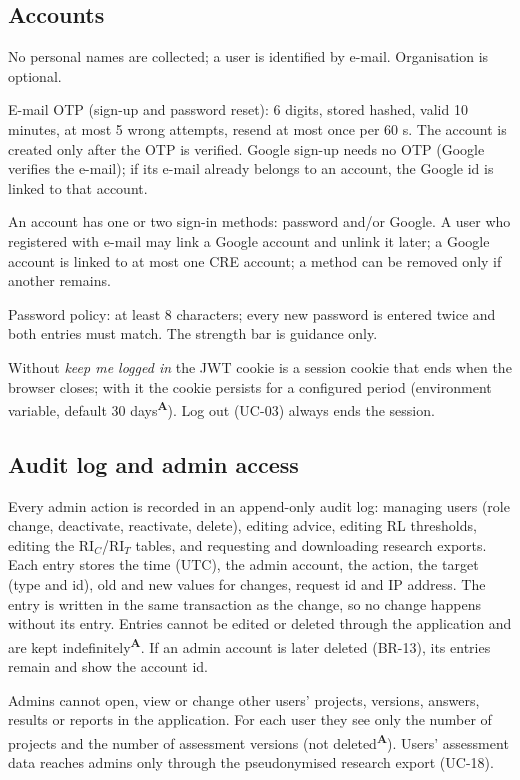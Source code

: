 \documentclass[11pt,a4paper]{article}
\newcommand{\RIC}{\mathrm{RI}_{C}}
\newcommand{\RIT}{\mathrm{RI}_{T}}
\newcommand{\assume}{\textsuperscript{\textcolor{orange!80!black}{\textbf{A}}}}
\begin{document}
\subsection*{Accounts}
\begin{description}[style=nextline,leftmargin=1.6cm,labelwidth=1.4cm,font=\bfseries\color{creBlue}]
\item[BR-15] No personal names are collected; a user is identified by e-mail. Organisation is optional.
\item[BR-16] E-mail OTP (sign-up and password reset): 6 digits, stored hashed, valid 10 minutes, at most 5 wrong attempts, resend at most once per 60 s. The account is created only after the OTP is verified. Google sign-up needs no OTP (Google verifies the e-mail); if its e-mail already belongs to an account, the Google id is linked to that account.
\item[BR-17] An account has one or two sign-in methods: password and/or Google. A user who registered with e-mail may link a Google account and unlink it later; a Google account is linked to at most one CRE account; a method can be removed only if another remains.
\item[BR-22] Password policy: at least 8 characters; every new password is entered twice and both entries must match. The strength bar is guidance only.
\item[BR-23] Without \emph{keep me logged in} the JWT cookie is a session cookie that ends when the browser closes; with it the cookie persists for a configured period (environment variable, default 30 days\assume). Log out (UC-03) always ends the session.
\end{description}

\subsection*{Audit log and admin access}
\begin{description}[style=nextline,leftmargin=1.6cm,labelwidth=1.4cm,font=\bfseries\color{creBlue}]
\item[BR-20] Every admin action is recorded in an append-only audit log: managing users (role change, deactivate, reactivate, delete), editing advice, editing RL thresholds, editing the $\RIC$/$\RIT$ tables, and requesting and downloading research exports. Each entry stores the time (UTC), the admin account, the action, the target (type and id), old and new values for changes, request id and IP address. The entry is written in the same transaction as the change, so no change happens without its entry. Entries cannot be edited or deleted through the application and are kept indefinitely\assume. If an admin account is later deleted (BR-13), its entries remain and show the account id.
\item[BR-21] Admins cannot open, view or change other users' projects, versions, answers, results or reports in the application. For each user they see only the number of projects and the number of assessment versions (not deleted\assume). Users' assessment data reaches admins only through the pseudonymised research export (UC-18).
\end{description}
\end{document}
